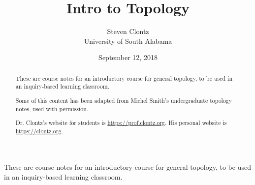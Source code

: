 \documentclass[10pt,]{article}
\title{Intro to Topology}
\author{Steven Clontz\\
University of South Alabama
}
\date{September 12, 2018}
\begin{document}
\hypertarget{index}{}
\maketitle
\thispagestyle{empty}
\begin{abstract}
\hypertarget{p-1}{}%
These are course notes for an introductory course for general topology, to be used in an inquiry-based learning classroom.%
\par
\hypertarget{p-2}{}%
Some of this content has been adapted from Michel Smith's undergraduate topology notes, used with permission.%
\par
\hypertarget{p-3}{}%
Dr. Clontz's website for students is \url{https://prof.clontz.org}. His personal website is \url{https://clontz.org}.%
\end{abstract}
\hypertarget{p-4}{}%
These are course notes for an introductory course for general topology, to be used in an inquiry-based learning classroom.%
%
%
\typeout{************************************************}
\typeout{************************************************}
%
\end{document}
